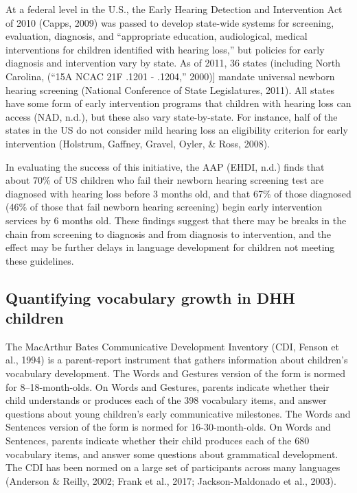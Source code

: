\documentclass[english,man]{apa6}
\begin{document}
At a federal level in the U.S., the Early Hearing Detection and Intervention Act of 2010 (Capps, 2009) was passed to develop state-wide systems for screening, evaluation, diagnosis, and \enquote{appropriate education, audiological, medical interventions for children identified with hearing loss,} but policies for early diagnosis and intervention vary by state. As of 2011, 36 states (including North Carolina, (``15A NCAC 21F .1201 - .1204,'' 2000){]} mandate universal newborn hearing screening (National Conference of State Legislatures, 2011). All states have some form of early intervention programs that children with hearing loss can access (NAD, n.d.), but these also vary state-by-state. For instance, half of the states in the US do not consider mild hearing loss an eligibility criterion for early intervention (Holstrum, Gaffney, Gravel, Oyler, \& Ross, 2008).

In evaluating the success of this initiative, the AAP (EHDI, n.d.) finds that about 70\% of US children who fail their newborn hearing screening test are diagnosed with hearing loss before 3 months old, and that 67\% of those diagnosed (46\% of those that fail newborn hearing screening) begin early intervention services by 6 months old. These findings suggest that there may be breaks in the chain from screening to diagnosis and from diagnosis to intervention, and the effect may be further delays in language development for children not meeting these guidelines.

\hypertarget{quantifying-vocabulary-growth-in-dhh-children}{%
\subsection{Quantifying vocabulary growth in DHH children}\label{quantifying-vocabulary-growth-in-dhh-children}}

The MacArthur Bates Communicative Development Inventory (CDI, Fenson et al., 1994) is a parent-report instrument that gathers information about children's vocabulary development. The Words and Gestures version of the form is normed for 8--18-month-olds. On Words and Gestures, parents indicate whether their child understands or produces each of the 398 vocabulary items, and answer questions about young children's early communicative milestones. The Words and Sentences version of the form is normed for 16-30-month-olds. On Words and Sentences, parents indicate whether their child produces each of the 680 vocabulary items, and answer some questions about grammatical development. The CDI has been normed on a large set of participants across many languages (Anderson \& Reilly, 2002; Frank et al., 2017; Jackson-Maldonado et al., 2003).
\end{document}
